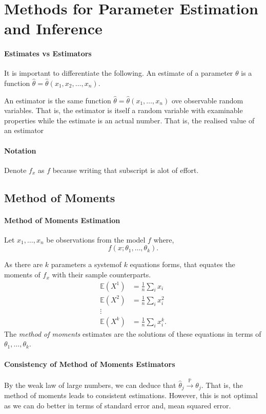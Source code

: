 \section{Methods for Parameter Estimation and Inference}

\paragraph{Estimates vs Estimators}
It is important to differentiate the following. An estimate of a parameter \(\theta\)
is a function \(\hat{\theta} = \hat{\theta}(x_1, x_2, \ldots, x_n)\).

An estimator is the same function \(\hat{\theta} = \hat{\theta}(x_1, \ldots, x_n)\) ove
observable random variables. That is, the estimator is itself a random variable with examinable
properties while the estimate is an actual number. That is, the realised value of an estimator

\paragraph{Notation}
Denote \(f_x\) as  \(f\) because writing that subscript is alot of effort.



\subsection{Method of Moments}
\paragraph{Method of Moments Estimation}
Let \(x_1, \ldots, x_n\) be observations from the model \(f\) where,  \[
  f(x; \theta_1, \ldots, \theta_k)
.\] 

As there are \(k\) parameters a systemof  \(k\) equations forms, that equates the moments of  \(f_x\)
with their sample counterparts.
\begin{align*}
  \mathbb{E}(X^1) &= \frac{1}{n} \sum_i x_i \\
  \mathbb{E}(X^2) &= \frac{1}{n} \sum_i x^2_i \\
  \vdots \\
  \mathbb{E}(X^k) &= \frac{1}{n} \sum_i x^k_i
.\end{align*}
The \textit{method of moments} estimates are the solutions of these equations in
terms of \(\theta_1, \ldots, \theta_k\).

\paragraph{Consistency of Method of Moments Estimators}
By the weak law of large numbers, we can deduce that
\(\hat{\theta}_j \xrightarrow{\mathbb{P}} \theta_j\).
That is, the method of moments leads to consistent estimations.
However, this is not optimal as we can do better in terms of standard error and,
mean squared error.

